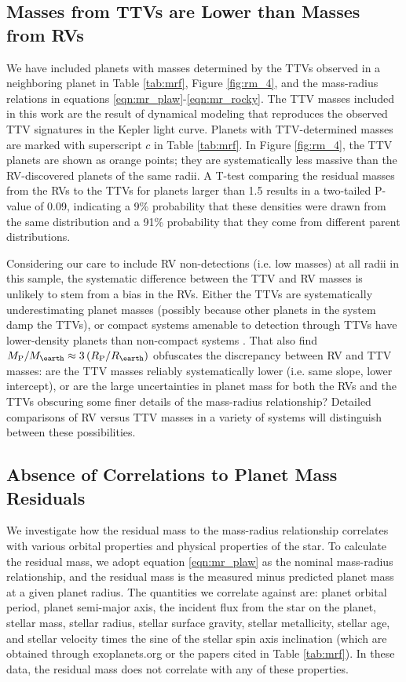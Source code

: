 \documentclass[iop]{emulateapj}
\begin{document}
\subsection{Masses from TTVs are Lower than Masses from RVs}
We have included planets with masses determined by the TTVs observed in a neighboring planet in Table \ref{tab:mrf}, Figure \ref{fig:rm_4}, and the mass-radius relations in equations \ref{eqn:mr_plaw}-\ref{eqn:mr_rocky}.  The TTV masses included in this work are the result of dynamical modeling that reproduces the observed TTV signatures in the Kepler light curve.  Planets with TTV-determined masses are marked with superscript $c$ in Table \ref{tab:mrf}.  In Figure \ref{fig:rm_4}, the TTV planets are shown as orange points; they are systematically less massive than the RV-discovered planets of the same radii.  A T-test comparing the residual masses from the RVs to the TTVs for planets larger than 1.5 \rearth results in a two-tailed P-value of 0.09, indicating a 9\% probability that these densities were drawn from the same distribution and a 91\% probability that they come from different parent distributions.

Considering our care to include RV non-detections (i.e. low masses) at all radii in this sample, the systematic difference between the TTV and RV masses is unlikely to stem from a bias in the RVs.  Either the TTVs are systematically underestimating planet masses (possibly because other planets in the system damp the TTVs), or compact systems amenable to detection through TTVs have lower-density planets than non-compact systems \citep[e.g. the Kepler-11 system][]{Lissauer2013}.  That \citet{WL2013} also find $\mpl/\mearth \approx 3 \left(\rpl/\rearth\right)$ obfuscates the discrepancy between RV and TTV masses: are the TTV masses reliably systematically lower (i.e. same slope, lower intercept), or are the large uncertainties in planet mass for both the RVs and the TTVs obscuring some finer details of the mass-radius relationship?  Detailed comparisons of RV versus TTV masses in a variety of systems will distinguish between these possibilities.

\subsection{Absence of Correlations to Planet Mass Residuals}
We investigate how the residual mass to the mass-radius relationship correlates with various orbital properties and physical properties of the star.  To calculate the residual mass, we adopt equation \ref{eqn:mr_plaw} as the nominal mass-radius relationship, and the residual mass is the measured minus predicted planet mass at a given planet radius.  The quantities we correlate against are: planet orbital period, planet semi-major axis, the incident flux from the star on the planet, stellar mass, stellar radius, stellar surface gravity, stellar metallicity, stellar age, and stellar velocity times the sine of the stellar spin axis inclination (which are obtained through exoplanets.org or the papers cited in Table \ref{tab:mrf}).  In these data, the residual mass does not correlate with any of these properties.
\end{document}
